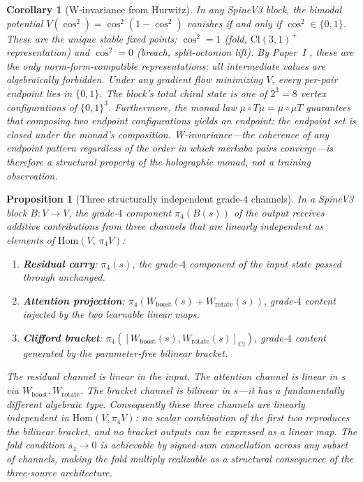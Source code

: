 \documentclass[11pt,a4paper]{article}
\theoremstyle{plain}
\newtheorem{proposition}[theorem]{Proposition}
\newtheorem{corollary}[theorem]{Corollary}
\theoremstyle{definition}
\theoremstyle{remark}
\numberwithin{equation}{section}
\providecommand{\Cl}{\mathrm{Cl}}
\begin{document}
\begin{corollary}[W-invariance from Hurwitz]
\label{cor:w-invariance}
In any SpineV3 block, the bimodal potential
$V(\cos^2) = \cos^2(1 - \cos^2)$ vanishes if and only if
$\cos^2 \in \{0, 1\}$.  These are the unique stable fixed
points: $\cos^2 = 1$ (fold, $\Cl(3,1)^+$ representation) and
$\cos^2 = 0$ (breach, split-octonion lift).  By
Paper~I \cite[\S 4, Thm.~4.2]{paper-I-substrate},
these are the only norm-form-compatible representations; all
intermediate values are algebraically forbidden.  Under any
gradient flow minimizing $V$, every per-pair endpoint lies in
$\{0, 1\}$.  The block's total chiral state is one of
$2^3 = 8$ vertex configurations of $\{0, 1\}^3$.
Furthermore, the monad law $\mu \circ T\mu = \mu \circ \mu T$
guarantees that composing two endpoint configurations yields
an endpoint: the endpoint set is closed under the monad's
composition.  W-invariance---the coherence of any endpoint
pattern regardless of the order in which merkaba pairs
converge---is therefore a structural property of the
holographic monad, not a training observation.
\end{corollary}

\begin{proposition}[Three structurally independent grade-$4$ channels]
\label{prop:three-channels}
In a SpineV3 block $B \colon V \to V$, the grade-$4$ component
$\pi_4(B(s))$ of the output receives additive contributions from
three channels that are linearly independent as elements of
$\mathrm{Hom}(V,\, \pi_4 V)$:
\begin{enumerate}[label=\textnormal{(\roman*)},nosep]
  \item \textbf{Residual carry}: $\pi_4(s)$, the grade-$4$
    component of the input state passed through unchanged.
  \item \textbf{Attention projection}: $\pi_4(W_{\mathrm{boost}}(s)
    + W_{\mathrm{rotate}}(s))$, grade-$4$ content injected by the
    two learnable linear maps.
  \item \textbf{Clifford bracket}: $\pi_4([W_{\mathrm{boost}}(s),
    W_{\mathrm{rotate}}(s)]_{\mathrm{Cl}})$, grade-$4$ content
    generated by the parameter-free bilinear bracket.
\end{enumerate}
The residual channel is linear in the input.  The attention channel
is linear in $s$ via $W_{\mathrm{boost}}, W_{\mathrm{rotate}}$.
The bracket channel is \emph{bilinear} in $s$---it has a
fundamentally different algebraic type.  Consequently these three
channels are linearly independent in $\mathrm{Hom}(V, \pi_4 V)$:
no scalar combination of the first two reproduces the bilinear
bracket, and no bracket outputs can be expressed as a linear map.
The fold condition $s_4 \to 0$ is achievable by signed-sum
cancellation across any subset of channels, making the fold
\emph{multiply realizable} as a structural consequence of the
three-source architecture.
\end{proposition}
\end{document}

